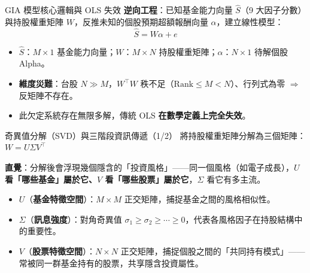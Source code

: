 \documentclass[aspectratio=169,11pt,t]{beamer}   %
\begin{document}
\begin{frame}{GIA 模型核心邏輯與 OLS 失效}
\vspace{0.25cm}
\textbf{逆向工程}：已知基金能力向量 $\hat S$（9 大因子分數）與持股權重矩陣 $W$，反推未知的個股預期超額報酬向量 $\alpha$，建立線性模型：
\[ \hat S = W\alpha + e \]
\vspace{-4pt}
\begin{itemize}\setlength{\itemsep}{7pt}
  \item $\hat S$：$M\times 1$ 基金能力向量；\quad $W$：$M\times N$ 持股權重矩陣；\quad $\alpha$：$N\times 1$ 待解個股 Alpha。
  \item \textbf{維度災難}：台股 $N \gg M$，$W^{\top}W$ 秩不足（$\mathrm{Rank}\le M < N$）、行列式為零 $\Rightarrow$ 反矩陣不存在。
  \item 此欠定系統存在無限多解，傳統 OLS \textbf{在數學定義上完全失效}。
\end{itemize}
\end{frame}

\begin{frame}{奇異值分解（SVD）與三階段資訊傳遞（1/2）}
\vspace{0.15cm}
將持股權重矩陣分解為三個矩陣： \quad $W = U\Sigma V^{\top}$
\vspace{4pt}

{\small\textcolor{nccublue}{\textbf{直覺}}：分解後會浮現幾個隱含的「投資風格」——同一個風格（如電子成長），\textbf{$U$ 看「哪些基金」屬於它、$V$ 看「哪些股票」屬於它}，$\Sigma$ 看它有多主流。}
\vspace{6pt}
\begin{itemize}\setlength{\itemsep}{8pt}
  \item $U$（\textbf{基金特徵空間}）：$M\times M$ 正交矩陣，捕捉基金之間的風格相似性。
  \item $\Sigma$（\textbf{訊息強度}）：對角奇異值 $\sigma_1\ge\sigma_2\ge\cdots\ge0$，代表各風格因子在持股結構中的重要性。
  \item $V$（\textbf{股票特徵空間}）：$N\times N$ 正交矩陣，捕捉個股之間的「共同持有模式」—— 常被同一群基金持有的股票，共享隱含投資屬性。
\end{itemize}
\end{frame}
\end{document}
